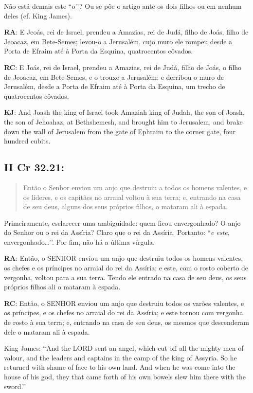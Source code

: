 Não está demais este ``o’’? Ou se põe o artigo ante os dois filhos ou
em nenhum deles (cf. King James).

\textbf{RA}: E Jeoás, rei de Israel, prendeu a Amazias, rei de Judá, filho de Joás, filho de Jeoacaz, em Bete-Semes; levou-o a Jerusalém, cujo muro ele rompeu desde a Porta de Efraim até à Porta da Esquina, quatrocentos côvados.

\textbf{RC}: E Joás, rei de Israel, prendeu a Amazias, rei de Judá, filho de Joás, o filho de Jeoacaz, em Bete-Semes, e o trouxe a Jerusalém; e derribou o muro de Jerusalém, desde a Porta de Efraim até à Porta da Esquina, um trecho de quatrocentos côvados.

\textbf{KJ}: And Joash the king of Israel took Amaziah king of Judah, the son of Joash, the son of Jehoahaz, at Bethshemesh, and brought him to Jerusalem, and brake down the wall of Jerusalem from the gate of Ephraim to the corner gate, four hundred cubits.

\subsection{II Cr 32.21:}
\begin{quote}
    \small
 Então o Senhor enviou um anjo que destruiu a todos os homens valentes, e os líderes, e os capitães no arraial  voltou à sua terra; e, entrando na casa de seu deus, alguns dos seus próprios filhos\uline{,} o mataram ali à espada.
 \end{quote}

Primeiramente, esclarecer uma ambiguidade: quem ficou envergonhado? O
anjo do Senhor ou o rei da Assíria? Claro que o rei da Assíria.
Portanto: ``\emph{e este}, envergonhado\ldots’’. Por fim, não há a
última vírgula.

\textbf{RA}: Então, o SENHOR enviou um anjo que destruiu todos os homens valentes, os chefes e os príncipes no arraial do rei da Assíria; e este, com o rosto coberto de vergonha, voltou para a sua terra. Tendo ele entrado na casa de seu deus, os seus próprios filhos ali o mataram à espada.

\textbf{RC}: Então, o SENHOR enviou um anjo que destruiu todos os varões valentes, e os príncipes, e os chefes no arraial do rei da Assíria; e este tornou com vergonha de rosto à sua terra; e, entrando na casa de seu deus, os mesmos que descenderam dele o mataram ali à espada.

King James: ``And the LORD sent an angel, which cut off all the mighty men of valour, and the leaders and captains in the camp of the king of Assyria. So he returned with shame of face to his own land. And when he was come into the house of his god, they that came forth of his own bowels slew him there with the sword.’’

